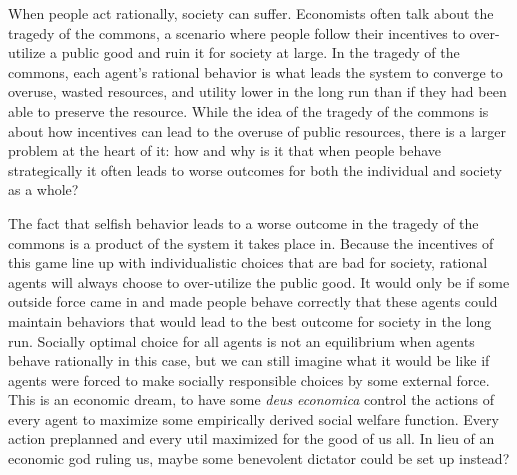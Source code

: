 \documentclass[12pt,twoside]{reedthesis}
\begin{document}
\doublespacing

When people act rationally, society can suffer. Economists often talk about the tragedy of the commons, a scenario where people follow their incentives to over-utilize a public good and ruin it for society at large. In the tragedy of the commons, each agent's rational behavior is what leads the system to converge to overuse, wasted resources, and utility lower in the long run than if they had been able to preserve the resource. While the idea of the tragedy of the commons is about how incentives can lead to the overuse of public resources, there is a larger problem at the heart of it: how and why is it that when people behave strategically it often leads to worse outcomes for both the individual and society as a whole? 

The fact that selfish behavior leads to a worse outcome in the tragedy of the commons is a product of the system it takes place in. Because the incentives of this game line up with individualistic choices that are bad for society, rational agents will always choose to over-utilize the public good. It would only be if some outside force came in and made people behave correctly that these agents could maintain behaviors that would lead to the best outcome for society in the long run. Socially optimal choice for all agents is not an equilibrium when agents behave rationally in this case, but we can still imagine what it would be like if agents were forced to make socially responsible choices by some external force. This is an economic dream, to have some {\em deus economica} control the actions of every agent to maximize some empirically derived social welfare function. Every action preplanned and every util maximized for the good of us all. In lieu of an economic god ruling us, maybe some benevolent dictator could be set up instead? 
\end{document}
